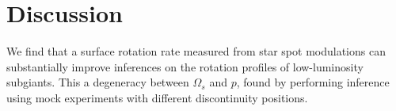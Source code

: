 \section{Discussion}
\label{sec:discussion_subg}

We find that a surface rotation rate measured from star spot modulations can substantially improve inferences on the rotation profiles of low-luminosity subgiants. 
This  a degeneracy between $\Omega_s$ and $p$, found by performing inference using mock experiments with different discontinuity positions.
